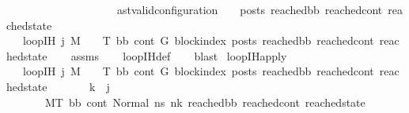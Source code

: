 \begin{isabellebody}
\ \ \ \ \ \ \ \ \ \ \ \ \ \ \ \ \ \ \ \ {\isacharparenleft}{\kern0pt}ast{\isacharunderscore}{\kern0pt}valid{\isacharunderscore}{\kern0pt}configuration\ {\isasymLambda}\ {\isasymGamma}\ {\isasymOmega}\ posts\ reached{\isacharunderscore}{\kern0pt}bb\ reached{\isacharunderscore}{\kern0pt}cont\ reached{\isacharunderscore}{\kern0pt}state{\isacharparenright}{\kern0pt}{\isachardoublequoteclose}\isanewline
\ \ \ {\isachardoublequoteopen}loop{\isacharunderscore}{\kern0pt}IH\ j\ M\ {\isasymLambda}\ {\isasymGamma}\ {\isasymOmega}\ T\ bb{}\ cont{}\ G\ block{\isacharunderscore}{\kern0pt}index\ posts\ reached{\isacharunderscore}{\kern0pt}bb\ reached{\isacharunderscore}{\kern0pt}cont\ reached{\isacharunderscore}{\kern0pt}state{\isachardoublequoteclose}\isanewline
%
\isadelimproof
\ \ %
\endisadelimproof
%
\isatagproof
{}\isamarkupfalse%
\ assms\isanewline
\ \ \isamarkupfalse%
\ loop{\isacharunderscore}{\kern0pt}IH{\isacharunderscore}{\kern0pt}def\isanewline
\ \ \isamarkupfalse%
\ blast%
\endisatagproof
{\isafoldproof}%
%
\isadelimproof
\isanewline
%
\endisadelimproof
\isanewline
{}\isamarkupfalse%
\ loop{\isacharunderscore}{\kern0pt}IH{\isacharunderscore}{\kern0pt}apply{\isacharcolon}{\kern0pt}\isanewline
\ \ \ {\isachardoublequoteopen}loop{\isacharunderscore}{\kern0pt}IH\ j\ M\ {\isasymLambda}\ {\isasymGamma}\ {\isasymOmega}\ T\ bb{}\ cont{}\ G\ block{\isacharunderscore}{\kern0pt}index\ posts\ reached{\isacharunderscore}{\kern0pt}bb\ reached{\isacharunderscore}{\kern0pt}cont\ reached{\isacharunderscore}{\kern0pt}state{\isachardoublequoteclose}\isanewline
\ \ \ \ \ \ \ {\isachardoublequoteopen}k\ {\isacharless}{\kern0pt}\ j{\isachardoublequoteclose}\isanewline
\ \ \ \ \ \ \ {\isachardoublequoteopen}{\isacharparenleft}{\kern0pt}M{\isacharcomma}{\kern0pt}{\isasymLambda}{\isacharcomma}{\kern0pt}{\isasymGamma}{\isacharcomma}{\kern0pt}{\isasymOmega}{\isacharcomma}{\kern0pt}T\ {\isasymturnstile}{\isacharparenleft}{\kern0pt}bb{}{\isacharcomma}{\kern0pt}\ cont{}{\isacharcomma}{\kern0pt}\ Normal\ ns{}{\isacharparenright}{\kern0pt}\ {\isacharminus}{\kern0pt}n{\isasymlongrightarrow}{\isacharcircum}{\kern0pt}k\ {\isacharparenleft}{\kern0pt}reached{\isacharunderscore}{\kern0pt}bb{\isacharcomma}{\kern0pt}\ reached{\isacharunderscore}{\kern0pt}cont{\isacharcomma}{\kern0pt}\ reached{\isacharunderscore}{\kern0pt}state{\isacharparenright}{\kern0pt}{\isacharparenright}{\kern0pt}{\isachardoublequoteclose}\isanewline

\end{isabellebody}
